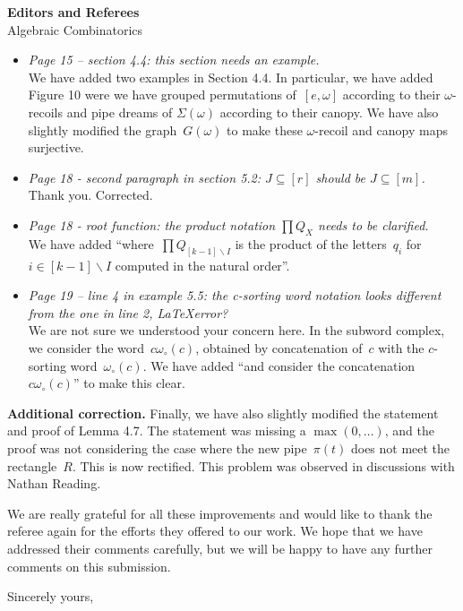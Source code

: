 \documentclass{letter}
\begin{document}
\begin{letter}{{\bf Editors and Referees} \\ Algebraic Combinatorics}
\begin{itemize}
\item \textsl{\color{gray} Page 15 -- section 4.4: this section needs an example.} \\
We have added two examples in Section 4.4. In particular, we have added Figure 10 were we have grouped permutations of~$[e,\omega]$ according to their $\omega$-recoils and pipe dreams of $\Sigma(\omega)$ according to their canopy.
We have also slightly modified the graph~$G(\omega)$ to make these $\omega$-recoil and canopy maps surjective.

\item \textsl{\color{gray} Page 18 - second paragraph in section 5.2: $J\subseteq [r]$ should be $J\subseteq [m]$.} \\
Thank you. Corrected.

\item \textsl{\color{gray} Page 18 - root function: the product notation $\prod Q_X$ needs to be clarified.} \\
We have added ``where~$\prod Q_{[k-1]\smallsetminus I}$ is the product of the letters~$q_i$ for~$i \in [k-1] \smallsetminus I$ computed in the natural order''.

\item \textsl{\color{gray} Page 19 -- line 4 in example 5.5: the c-sorting word notation looks different from the one in line 2, \LaTeX error?} \\
We are not sure we understood your concern here. In the subword complex, we consider the word~$c\omega_\circ(c)$, obtained by concatenation of~$c$ with the $c$-sorting word~$\omega_\circ(c)$. We have added ``and consider the concatenation~$c\omega_\circ(c)$'' to make this clear.

\end{itemize}

{\bf Additional correction.}
Finally, we have also slightly modified the statement and proof of Lemma 4.7.
The statement was missing a $\max(0, \dots)$, and the proof was not considering the case where the new pipe~$\pi(t)$ does not meet the rectangle~$R$.
This is now rectified.
This problem was observed in discussions with Nathan Reading.

We are really grateful for all these improvements and would like to thank the referee again for the efforts they offered to our work. We hope that we have addressed their comments carefully, but we will be happy to have any further comments on this submission.

%

\closing{Sincerely yours,}

\end{letter}
\end{document}
